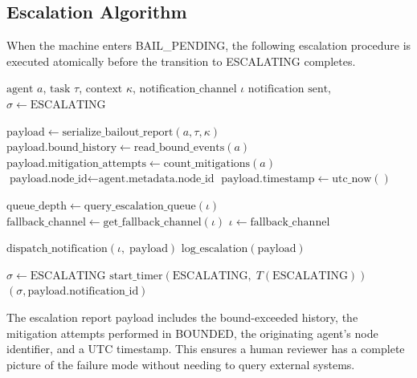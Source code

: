 
\subsection{Escalation Algorithm}

When the machine enters BAIL\_PENDING, the following escalation procedure
is executed atomically before the transition to ESCALATING completes.

\begin{algorithm}[H]
\caption{Escalation Procedure}
\label{alg:escalation}
\begin{algorithmic}[1]
\Require $\text{agent } a$, $\text{task } \tau$, $\text{context } \kappa$,
         $\text{notification\_channel } \iota$
\Ensure $\text{notification sent}$, $\sigma \gets \text{ESCALATING}$

\State $\text{payload} \gets \text{serialize\_bailout\_report}(a, \tau, \kappa)$
\State $\text{payload.bound\_history} \gets \text{read\_bound\_events}(a)$
\State $\text{payload.mitigation\_attempts} \gets
        \text{count\_mitigations}(a)$
\State $\text{payload.node\_id} \gets \text{agent.metadata.node\_id}$
\State $\text{payload.timestamp} \gets \text{utc\_now}()$

\State $\text{queue\_depth} \gets \text{query\_escalation\_queue}(\iota)$
    \State $\text{fallback\_channel} \gets \text{get\_fallback\_channel}(\iota)$
    \State $\iota \gets \text{fallback\_channel}$
\EndIf

\State $\text{dispatch\_notification}(\iota,\; \text{payload})$
\State $\text{log\_escalation}(\text{payload})$

\State $\sigma \gets \text{ESCALATING}$
\State $\text{start\_timer}(\text{ESCALATING},\; T(\text{ESCALATING}))$
\State \Return $(\sigma, \text{payload.notification\_id})$
\end{algorithmic}
\end{algorithm}

\bigskip
The escalation report payload includes the bound-exceeded history, the
mitigation attempts performed in BOUNDED, the originating agent's node
identifier, and a UTC timestamp.  This ensures a human reviewer has a
complete picture of the failure mode without needing to query external
systems.

